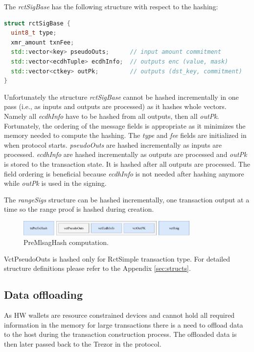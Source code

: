 \documentclass[]{article}
\begin{document}
The \emph{rctSigBase} has the following structure with respect to the hashing:  
\begin{lstlisting}[language=c++]
struct rctSigBase {
  uint8_t type;
  xmr_amount txnFee;
  std::vector<key> pseudoOuts;      // input amount commitment
  std::vector<ecdhTuple> ecdhInfo;  // outputs enc (value, mask)
  std::vector<ctkey> outPk;         // outputs (dst_key, commitment)
}
\end{lstlisting}

Unfortunately the structure \emph{rctSigBase} cannot be hashed incrementally in one pass (i.e., as inputs and outputs are processed) as it hashes whole vectors. Namely all \emph{ecdhInfo} have to be hashed from all outputs, then all \emph{outPk}. Fortunately, the ordering of the message fields is appropriate as it minimizes the memory needed to compute the hashing. The \emph{type} and \emph{fee} fields are initialized in when protocol starts. \emph{pseudoOuts} are hashed incrementally as inputs are processed. \emph{ecdhInfo} are hashed incrementally as outputs are processed and \emph{outPk} is stored to the transaction state. It is hashed after all outputs are processed. The field ordering is beneficial because \emph{ecdhInfo} is not needed after hashing anymore while \emph{outPk} is used in the signing.

The \emph{rangeSigs} structure can be hashed incrementally, one transaction output at a time so the range proof is hashed during creation.

\begin{figure}[H]
	\centering
	\includegraphics[width=0.8\textwidth,clip, angle=0]{img/premlsag_hash.pdf}
	\caption{PreMlsagHash computation.}
\end{figure}


VctPseudoOuts is hashed only for RctSimple transaction type. 
For detailed structure definitions please refer to the Appendix \ref{sec:structs}. 

\subsection{Data offloading}
As HW wallets are resource constrained devices and cannot hold all required information in the memory for large transactions there is a need to offload data to the host during the transaction construction process. The offloaded data is then later passed back to the Trezor in the protocol.
\end{document}
